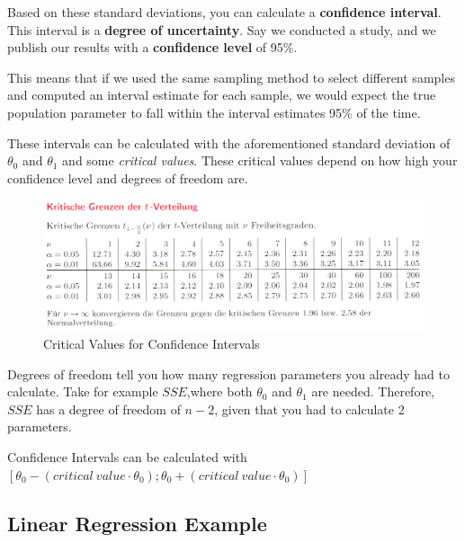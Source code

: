 \documentclass[11pt]{article}
\begin{document}
\vspace{10px}

Based on these standard deviations, you can calculate a \textbf{confidence interval}. This interval is a \textbf{degree of uncertainty}. Say we conducted a study, and we publish our results with a \textbf{confidence level} of 95\%.

This means that if we used the same sampling method to select different samples and computed an interval estimate for each sample, we would expect the true population parameter to fall within the interval estimates 95\% of the time.

\vspace{10px}

These intervals can be calculated with the aforementioned standard deviation of $\theta^{}_{0}$ and $\theta^{}_{1}$ and some \textit{critical values}. These critical values depend on how high your confidence level and degrees of freedom are.

\begin{figure}[htb!]
    \centering
    \includegraphics[keepaspectratio=true, width=\linewidth]{CriticalBordersTInterval.png}
    \caption{Critical Values for Confidence Intervals}
    \label{fig:critical_values}
\end{figure}


Degrees of freedom tell you how many regression parameters you already had to calculate. Take for example $SSE$,where both $\theta^{}_{0}$ and $\theta^{}_{1}$ are needed. Therefore, $SSE$ has a degree of freedom of $n-2$, given that you had to calculate 2 parameters.

\vspace{10px}

\noindent Confidence Intervals can be calculated with $[\theta_0 - (critical\ value \cdot \theta_0);\theta_0 + (critical\ value \cdot \theta_0)]$


\newpage

\subsection{Linear Regression Example}
\end{document}

